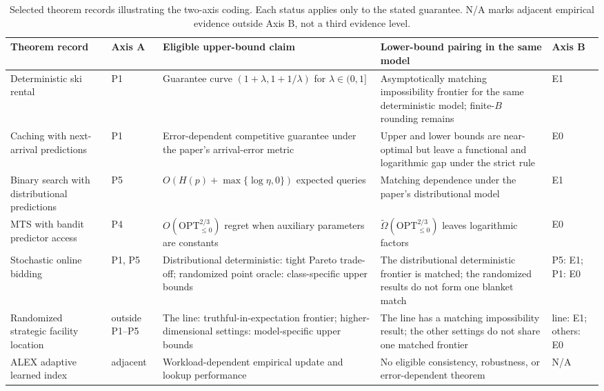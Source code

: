 \documentclass[acmsmall,screen,nonacm]{acmart}
\theoremstyle{acmdefinition}%
\begin{document}
\begin{table}[t!]
\centering
\nomakegapedcells
\setlength{\tabcolsep}{3pt}
\caption{Selected theorem records illustrating the two-axis coding. Each status applies only to the stated guarantee. N/A marks adjacent empirical evidence outside Axis B, not a third evidence level.}
\label{tab:laa_taxonomy}
\fontsize{6.5}{7.25}\selectfont
\begin{tabularx}{\textwidth}{@{}>{\raggedright\arraybackslash}p{2.26cm}>{\centering\arraybackslash}p{0.92cm}YY>{\centering\arraybackslash}p{0.72cm}@{}}
\toprule
\textbf{Theorem record} & \textbf{Axis A} & \textbf{Eligible upper-bound claim} & \textbf{Lower-bound pairing in the same model} & \textbf{Axis B} \\
\midrule
Deterministic ski rental~\cite{purohit2018improving,wei2020optimal}
& P1 & Guarantee curve $(1+\lambda,1+1/\lambda)$ for $\lambda\in(0,1]$ & Asymptotically matching impossibility frontier for the same deterministic model; finite-$B$ rounding remains & E1 \\
\addlinespace[1pt]
Caching with next-arrival predictions~\cite{rohatgi2020near}
& P1 & Error-dependent competitive guarantee under the paper's arrival-error metric & Upper and lower bounds are near-optimal but leave a functional and logarithmic gap under the strict rule & E0 \\
Binary search with distributional predictions~\cite{dinitz2024binarysearch}
& P5 & $O(H(p)+\max\{\log\eta,0\})$ expected queries & Matching dependence under the paper's distributional model & E1 \\
\addlinespace[1pt]
MTS with bandit predictor access~\cite{cosa2025bandit}
& P4 & $O(\mathrm{OPT}_{\leq0}^{2/3})$ regret when auxiliary parameters are constants & $\widetilde\Omega(\mathrm{OPT}_{\leq0}^{2/3})$ leaves logarithmic factors & E0 \\
\addlinespace[1pt]
Stochastic online bidding~\cite{angelopoulos2025bidding}
& P1, P5 & Distributional deterministic: tight Pareto trade-off; randomized point oracle: class-specific upper bounds & The distributional deterministic frontier is matched; the randomized results do not form one blanket match & P5: E1; P1: E0 \\
\addlinespace[1pt]
Randomized strategic facility location~\cite{balkanski2024randomized}
& outside P1--P5 & The line: truthful-in-expectation frontier; higher-dimensional settings: model-specific upper bounds & The line has a matching impossibility result; the other settings do not share one matched frontier & line: E1; others: E0 \\
\addlinespace[1pt]
ALEX adaptive learned index~\cite{ding2020alex}
& adjacent & Workload-dependent empirical update and lookup performance & No eligible consistency, robustness, or error-dependent theorem & N/A \\
\bottomrule
\end{tabularx}
\end{table}
\end{document}
